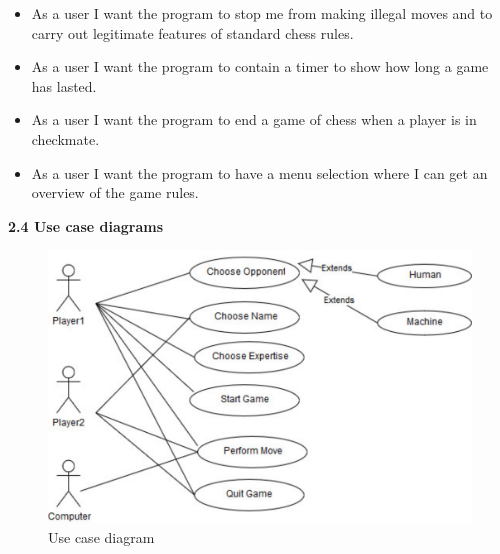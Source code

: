 \documentclass{article}
\begin{document}
\begin{flushleft}
\begin{itemize}
	\item As a user I want the program to stop me from making illegal moves and to carry out legitimate features of standard chess rules.
	\item As a user I want the program to contain a timer to show how long a game has lasted.
	\item As a user I want the program to end a game of chess when a player is in checkmate.
	\item As a user I want the program to have a menu selection where I can get an overview of the game rules.
	\end{itemize}
\vspace{5mm}


\textbf{2.4	Use case diagrams}\\

\end{flushleft}


\begin{figure}[h]
		\includegraphics*[scale=0.8]{User_case_diagram_1}
	\caption{Use case diagram }
	
\end{figure}
\end{document}
